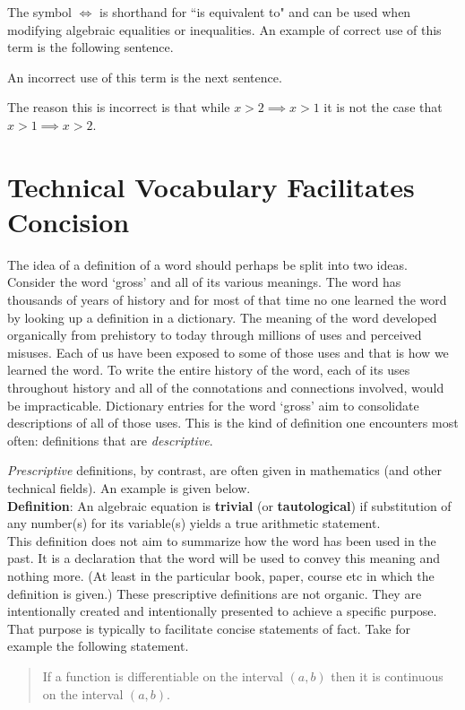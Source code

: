 \documentclass[12pt]{article}
\def\LR{\Leftrightarrow}
\def\noi{\noindent}
\def\thup{\rightthumbsup}
\def\thdn{\rightthumbsdown}
\begin{document}
The symbol $\Leftrightarrow$ is shorthand for ``is equivalent to" and can be used when modifying algebraic equalities or inequalities. An example of correct use of this term is the following sentence. 
\begin{quote}
\shabox{$x+1=2 \LR x=1.$} \thup
\end{quote}
An incorrect use of this term is the next sentence.
\begin{quote}
\shabox{$x>2 \LR x>1.$} \thdn
\end{quote}
The reason this is incorrect is that while $x>2 \implies x>1$ it is not the case that $x>1 \implies x>2.$



\section{Technical Vocabulary Facilitates Concision }

The idea of a definition of a word should perhaps be split into two ideas. \\

Consider the word `gross' and all of its various meanings. 
The word has thousands of years of history and for most of that time no one learned the word by looking up a definition in a dictionary. The meaning of the word developed organically from prehistory to today through millions of uses and perceived misuses. Each of us have been exposed to some of those uses and that is how we learned the word. 
To write the entire history of the word, each of its uses throughout history and all of the connotations and connections involved, would be impracticable. 
Dictionary entries for the word `gross' aim to consolidate descriptions of all of those uses. This is the kind of definition one encounters most often: definitions that are {\it descriptive}.

{\it Prescriptive } definitions, by contrast, are often given in mathematics (and other technical fields). An example is given below. \\

 \noi
 {\bfseries Definition}: An algebraic equation is {\bfseries trivial} (or {\bfseries tautological}) if substitution of any number(s) for its variable(s) yields a true arithmetic statement. \\

This definition does not aim to summarize how the word has been used in the past. It is a declaration that the word will be used to convey this meaning and nothing more. (At least in the particular book, paper, course etc in which the definition is given.) These prescriptive definitions are not organic. 
They are intentionally created and intentionally presented to achieve a specific purpose. 
That purpose is typically to facilitate concise statements of fact. 
Take for example the following statement.
\begin{quote}
If a function is differentiable on the interval $(a,b)$ then it is continuous on the interval $(a,b)$.
\end{quote}
\end{document}
